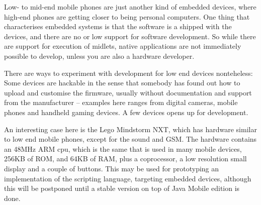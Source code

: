 \documentclass[11pt]{report}
\begin{document}
Low- to mid-end mobile phones are just another kind of embedded devices, where high-end phones are getting closer to being personal computers.
One thing that characterises embedded systems is that the software is a shipped with the devices, and there are no or low support for software development.
So while there are support for execution of midlets, native applications are not immediately possible to develop, unless you are also a hardware developer.

There are ways to experiment with development for low end devices nonteheless:
Some devices are hackable in the sense that somebody has found out how to upload and customise the firmware, usually without documentation and support from the manufacturer -- examples here ranges from digital cameras, mobile phones and handheld gaming devices.
A few devices opens up for development.

An interesting case here is the Lego Mindstorm NXT, which has hardware similar to low end mobile phones, except for the sound and GSM. 
The hardware contains an 48MHz ARM cpu\cite{arm7tdmi}, which is the same that is used in many mobile devices, 256KB of ROM, and 64KB of RAM, plus a coprocessor, a low resolution small display and a couple of buttons.
This may be used for prototyping an implementation of the scripting language, targeting embedded devices, although this will be postponed until a stable version on top of Java Mobile edition is done.
\end{document}
